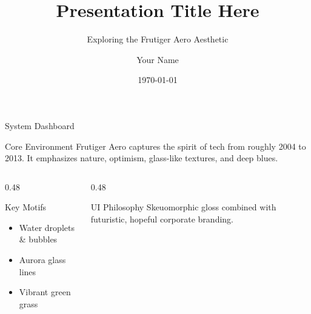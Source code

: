 \documentclass[aspectratio=169]{beamer}
\title{Presentation Title Here}
\subtitle{Exploring the Frutiger Aero Aesthetic}
\author{Your Name}
\date{\today}
\begin{document}
\begin{frame}[plain]
    \titlepage
\end{frame}

\begin{frame}{System Dashboard}
    \begin{aeroblock}{Core Environment}
        Frutiger Aero captures the spirit of tech from roughly 2004 to 2013. It emphasizes nature, optimism, glass-like textures, and deep blues.
    \end{aeroblock}
    
    \vspace{0.3cm}
    
    \begin{columns}
        \begin{column}{0.48\textwidth}
            \begin{aeroblock}{Key Motifs}
                \begin{itemize}
                    \item Water droplets \& bubbles
                    \item Aurora glass lines
                    \item Vibrant green grass
                \end{itemize}
            \end{aeroblock}
        \end{column}
        \begin{column}{0.48\textwidth}
            \begin{aeroblock}{UI Philosophy}
                Skeuomorphic gloss combined with futuristic, hopeful corporate branding.
            \end{aeroblock}
        \end{column}
    \end{columns}
\end{frame}
\end{document}
